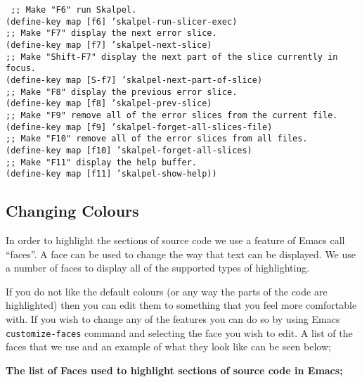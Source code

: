 \documentclass{report}
\begin{document}
\texttt{
  ;; Make "F6" run Skalpel.\\
  (define-key map [f6] 'skalpel-run-slicer-exec)\\
  ;; Make "F7" display the next error slice.\\
  (define-key map [f7] 'skalpel-next-slice)\\
  ;; Make "Shift-F7" display the next part of the slice currently in focus.\\
  (define-key map [S-f7] 'skalpel-next-part-of-slice)\\
  ;; Make "F8" display the previous error slice.\\
  (define-key map [f8] 'skalpel-prev-slice)\\
  ;; Make "F9" remove all of the error slices from the current file.\\
  (define-key map [f9] 'skalpel-forget-all-slices-file)\\
  ;; Make "F10" remove all of the error slices from all files.\\
  (define-key map [f10] 'skalpel-forget-all-slices)\\
  ;; Make "F11" display the help buffer.\\
  (define-key map [f11] 'skalpel-show-help))
}


\newpage


\subsection{Changing Colours}

In order to highlight the sections of source code we use a feature of
Emacs call ``faces''. A face can be used to change the way that text
can be displayed. We use a number of faces to display all of the
supported types of highlighting.

If you do not like the default colours (or any way the parts of the
code are highlighted) then you can edit them to something that you
feel more comfortable with. If you wish to change any of the features
you can do so by using Emacs \texttt{customize-faces} command and
selecting the face you wish to edit. A list of the faces that we use
and an example of what they look like can be seen below;

\medskip

\textbf{The list of Faces used to highlight sections of source code in
  Emacs;}
\end{document}
